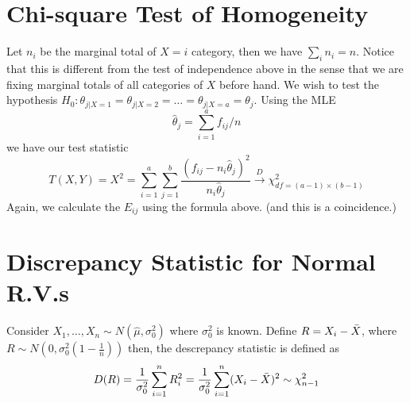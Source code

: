 \documentclass{article}
\begin{document}
\section{Chi-square Test of Homogeneity}
Let $n_i$ be the marginal total of $X=i$ category, then we have $\sum_i n_i = n$. Notice that this is different
from the test of independence above in the sense that we are fixing marginal totals of all categories of $X$ before hand.
We wish to test the hypothesis $H_0: \theta_{j|X=1} = \theta_{j|X=2} =\ldots= \theta_{j|X=a} = \theta_j$. Using the MLE
\begin{equation*}
    \hat{\theta}_j = \sum_{i=1}^a f_{ij}/n
\end{equation*}
we have our test statistic
\begin{equation*}
    T(X,Y) = X^2 = \sum_{i=1}^a\sum_{j=1}^b \frac{\left(f_{ij} - n_i\hat{\theta}_{j}\right)^2}{n_i\hat{\theta}_{j}} \xrightarrow{D} \chi^2_{df=(a-1)\times(b-1)}
\end{equation*}
Again, we calculate the $E_{ij}$ using the formula above. (and this is a coincidence.)


\section{Discrepancy Statistic for Normal R.V.s}
Consider $X_1,\ldots,X_n\sim N(\hat{\mu}, \sigma_0^2)$ where $\sigma_0^2$ is known. Define $R = X_i - \Bar{X}$, where $R\sim N(0, \sigma_0^2 (1 - \frac{1}{n}))$ then, the descrepancy statistic is defined as
\begin{equation*}
    D(R) = \frac{1}{\sigma_0^2}\sum_{i = 1}^n R_i^2 =  \frac{1}{\sigma_0^2}\sum_{i=1}^n(X_i - \Bar{X})^2 \sim \chi^2_{n-1}
\end{equation*}
\end{document}
